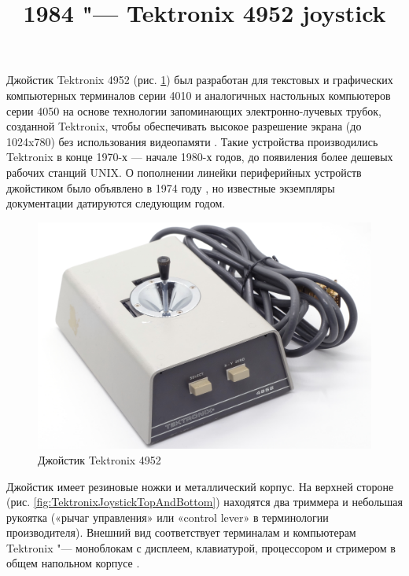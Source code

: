 \documentclass[11pt, a4paper]{article}
\begin{document}
\title{1984 "--- Tektronix 4952 joystick}
\date{}
\maketitle
{}

Джойстик Tektronix 4952 (рис. \ref{fig:TektronixJoystickPic}) был разработан для текстовых и графических компьютерных терминалов серии 4010 и аналогичных настольных компьютеров серии 4050 на основе технологии запоминающих электронно-лучевых трубок, созданной Tektronix, чтобы обеспечивать высокое разрешение экрана (до 1024x780) без использования видеопамяти \cite{wiki}. Такие устройства производились Tektronix в конце 1970-х — начале 1980-х годов, до появиления более дешевых рабочих станций UNIX. О пополнении линейки периферийных устройств джойстиком было объявлено в 1974 году \cite{adv}, но известные экземпляры документации датируются следующим годом.

\begin{figure}[h]
   \centering
    \includegraphics[scale=0.45]{1975_Tektronix_4952_Joystick/pic_30.jpg}
    \caption{Джойстик Tektronix 4952}
    \label{fig:TektronixJoystickPic}
\end{figure}

Джойстик имеет резиновые ножки и металлический корпус. На верхней стороне (рис. \ref{fig:TektronixJoystickTopAndBottom}) находятся два триммера \cite{manual} и небольшая рукоятка («рычаг управления» или «control lever» в терминологии производителя). Внешний вид соответствует терминалам и компьютерам Tektronix "--- моноблокам с дисплеем, клавиатурой, процессором и стримером в общем напольном корпусе \cite{wiki}.
\end{document}
